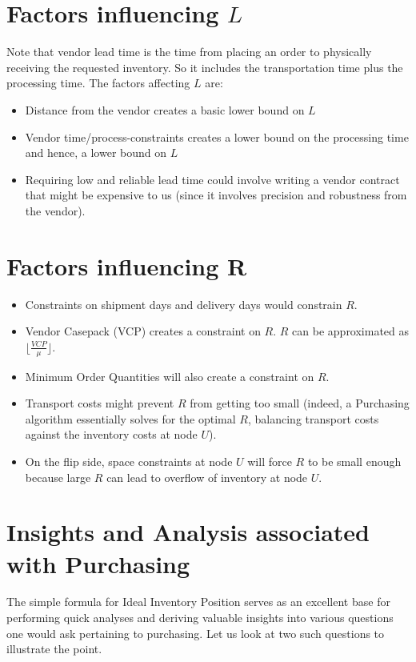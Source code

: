 \documentclass[11pt]{amsart}
\begin{document}
\section{Factors influencing $L$}
Note that vendor lead time is the time from placing an order to physically receiving the requested inventory. So it includes the transportation time plus the processing time. The factors affecting $L$ are:
\begin{itemize}
\item Distance from the vendor creates a basic lower bound on $L$
\item Vendor time/process-constraints creates a lower bound on the processing time and hence, a lower bound on $L$
\item Requiring low and reliable lead time could involve writing a vendor contract that might be expensive to us (since it involves precision and robustness from the vendor).
\end{itemize}

\section{Factors influencing R}
\begin{itemize}
\item Constraints on shipment days and delivery days would constrain $R$.
\item Vendor Casepack (VCP) creates a constraint on $R$. $R$ can be approximated as $\lfloor \frac {VCP} {\mu} \rfloor$.
\item Minimum Order Quantities will also create a constraint on $R$.
\item Transport costs might prevent $R$ from getting too small (indeed, a Purchasing algorithm essentially solves for the optimal $R$, balancing transport costs against the inventory costs at node $U$).
\item On the flip side, space constraints at node $U$ will force $R$ to be small enough because large $R$ can lead to overflow of inventory at node $U$.
\end{itemize}

\section{Insights and Analysis associated with Purchasing}

The simple formula for Ideal Inventory Position serves as an excellent base for performing quick analyses and deriving valuable insights into various questions one would ask pertaining to purchasing. Let us look at two such questions to illustrate the point.
\end{document}
